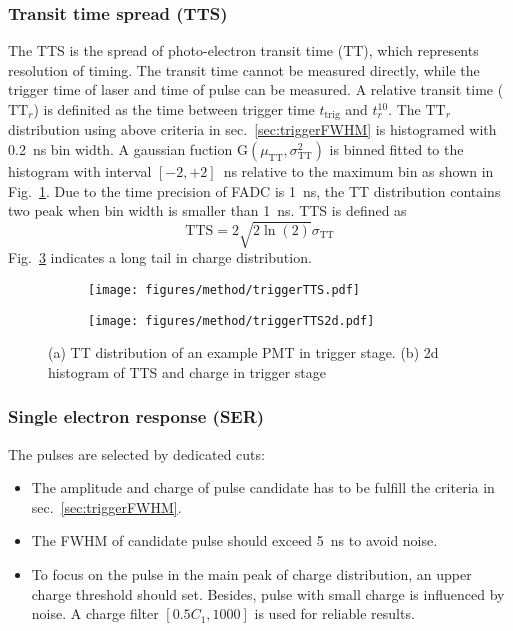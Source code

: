 \subsubsection{Transit time spread (TTS)}
The TTS is the spread of photo-electron transit time (TT), which represents resolution of timing. The transit time cannot be measured directly, while the trigger time of laser and time of pulse can be measured. A relative transit time ($\mathrm{TT}_r$) is definited as the time between trigger time $t_{\mathrm{trig}}$ and $t_r^{10}$. The $\mathrm{TT}_r$ distribution using above criteria in sec.~\ref{sec:triggerFWHM} is histogramed with \SI{0.2}{ns} bin width. A gaussian fuction G$(\mu_{\mathrm{TT}},\sigma_{\mathrm{TT}}^2)$ is binned fitted to the histogram with interval $[-2,+2]$\, ns relative to the maximum bin as shown in Fig.~\ref{fig:triggerTTS}. Due to the time precision of FADC is \SI{1}{ns}, the TT distribution contains two peak when bin width is smaller than \SI{1}{ns}. TTS is defined as
\begin{equation}
    \mathrm{TTS}=2\sqrt{2\ln(2)}\sigma_{\mathrm{TT}}
\end{equation}
Fig.~\ref{fig:triggerTTS2d} indicates a long tail in charge distribution.
\begin{figure}[!htbp]
    \centering
    \begin{subfigure}[t]{0.49\textwidth}
        \texttt{[image: figures/method/triggerTTS.pdf]}
        \caption{}
        \label{fig:triggerTTS}
    \end{subfigure}
    \begin{subfigure}[t]{0.49\textwidth}
        \texttt{[image: figures/method/triggerTTS2d.pdf]}
        \caption{}
        \label{fig:triggerTTS2d}
    \end{subfigure}
    \caption{(a) TT distribution of an example PMT in trigger stage. (b) 2d histogram of TTS and charge in trigger stage}
\end{figure}

\subsubsection{Single electron response (SER)}
The pulses are selected by dedicated cuts:
\begin{itemize}
    \item[1] The amplitude and charge of pulse candidate has to be fulfill the criteria in sec.~\ref{sec:triggerFWHM}.
    \item[2] The FWHM of candidate pulse should exceed \SI{5}{ns} to avoid noise.
    \item[3] To focus on the pulse in the main peak of charge distribution, an upper charge threshold should set. Besides, pulse with small charge is influenced by noise. A charge filter $[0.5C_1, 1000]$ is used for reliable results.
\end{itemize}

